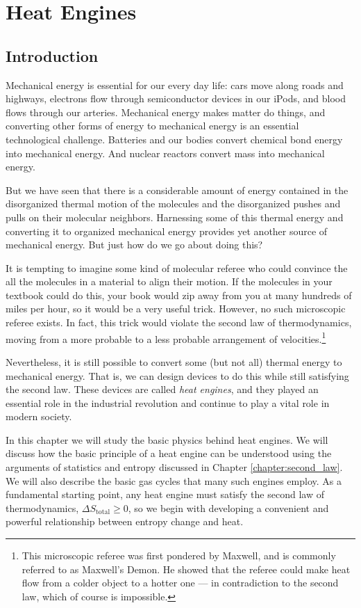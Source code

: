 \chapter{Heat Engines}
\label{chapter:heat_engines}

\section{Introduction}

Mechanical energy is essential for our every day life: cars move
along roads and highways, electrons flow through 
semiconductor devices in our iPods,
and blood flows through our arteries.  Mechanical energy makes matter
do things, and converting other forms of energy to mechanical energy
is an essential technological challenge.  Batteries and our bodies
convert chemical bond energy into mechanical energy.  And nuclear reactors
convert mass into mechanical energy.

But we have seen that there is a considerable amount of energy
contained in the disorganized thermal motion of the molecules and the
disorganized pushes and pulls on their molecular neighbors.
Harnessing some of this thermal energy and converting it to organized
mechanical energy provides yet another source of mechanical energy.
But just how do we go about doing this?

It is tempting to imagine some kind of molecular referee who could
convince the all the molecules in a material to align their motion.
If the molecules in your textbook could do this, your book would zip
away from you at many hundreds of miles per hour, so it would be a
very useful trick.  However, no such microscopic referee exists.  In
fact, this trick would violate the second law of thermodynamics,
moving from a more probable to a less probable arrangement of
velocities.\footnote{This microscopic referee was first pondered by
  Maxwell, and is commonly referred to as Maxwell's Demon.  He showed
  that the referee could make heat flow from a colder object to a
  hotter one --- in contradiction to the second law, which of course
  is impossible.}

Nevertheless, it is still possible to convert some (but not all)
thermal energy to mechanical energy.  That is, we can design devices
to do this while still satisfying the second law.  These devices are
called {\it heat engines}, and they played an essential role in the
industrial revolution and continue to play a vital role in modern
society.

In this chapter we will study the basic physics behind heat engines.
We will discuss how the basic principle of a heat engine can be
understood using the arguments of statistics and entropy discussed in
Chapter \ref{chapter:second_law}.  We will also describe the basic gas
cycles that many such engines employ.  As a fundamental starting
point, any heat engine must satisfy the second law of thermodynamics,
$\Delta S_\text{total} \ge 0$, so we begin with developing a
convenient and powerful relationship between entropy change and heat.


